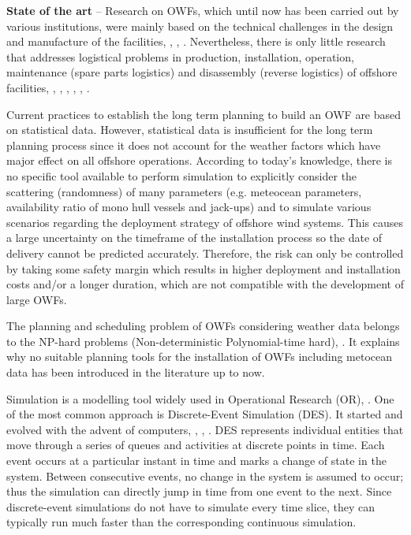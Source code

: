 \textbf{State of the art} --
Research on OWFs, which until now has been carried out by various institutions, were mainly based on the technical challenges in the design and manufacture of the facilities, \cite{Miller2013}, \cite{SerranoGonzalez2014}, \cite{Perveen2014}. Nevertheless, there is only little research that addresses logistical problems in production, installation, operation, maintenance (spare parts logistics) and disassembly (reverse logistics) of offshore facilities, \cite{Scholz2010}, \cite{Lange2012}, \cite{COMPIT11}, \cite{COMPIT12}, \cite{aitsimulation}, \cite{thalji2012}.

Current practices to establish the long term planning to build an OWF are based on statistical data. However, statistical data is insufficient for the long term planning process since it does not account for the weather factors which have major effect on all offshore operations. According to today’s knowledge, there is no specific tool available to perform simulation to explicitly consider the scattering (randomness) of many parameters (e.g. meteocean parameters, availability ratio of mono hull vessels and jack-ups) and to simulate various scenarios regarding the deployment strategy of offshore wind systems. This causes a large uncertainty on the timeframe of the installation process so the date of delivery cannot be predicted accurately. Therefore, the risk can only be controlled by taking some safety margin which results in higher deployment and installation costs and/or a longer duration, which are not compatible with the development of large OWFs.

The planning and scheduling problem of OWFs considering weather data belongs to the NP-hard problems (Non-deterministic Polynomial-time hard), \cite{leeuwen1990}. It explains why no suitable planning tools for the installation of OWFs including metocean data has been introduced in the literature up to now.

Simulation is a modelling tool widely used in Operational Research (OR), \cite{pidd2005computer}. One of the most common approach is Discrete-Event Simulation (DES). It started and evolved with the advent of computers, \cite{Myron1987}, \cite {William1988}, \cite{robinson2005}. DES represents individual entities that move through a series of queues and activities at discrete points in time. Each event occurs at a particular instant in time and marks a change of state in the system. Between consecutive events, no change in the system is assumed to occur; thus the simulation can directly jump in time from one event to the next. Since discrete-event simulations do not have to simulate every time slice, they can typically run much faster than the corresponding continuous simulation.

